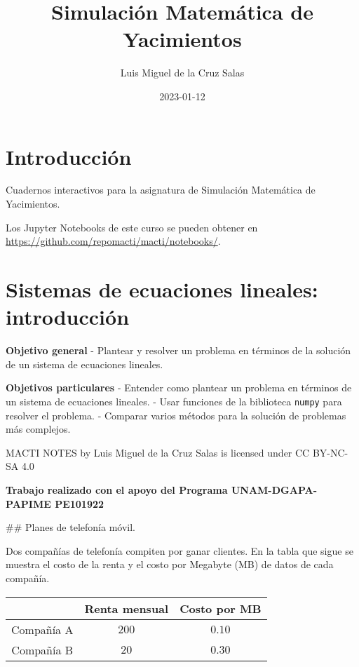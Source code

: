 \documentclass[
  letterpaper,
  DIV=11,
  numbers=noendperiod]{scrreprt}
\title{Simulación Matemática de Yacimientos}
\author{Luis Miguel de la Cruz Salas}
\date{2023-01-12}
\renewcommand*\contentsname{Table of contents}
\newcommand\contentsname{Table of contents}
\begin{document}
\maketitle

\renewcommand*\contentsname{Table of contents}
{
\hypersetup{linkcolor=}
\setcounter{tocdepth}{2}
\tableofcontents
}

\chapter*{Introducción}\label{introducciuxf3n}


Cuadernos interactivos para la asignatura de Simulación Matemática de
Yacimientos.

Los Jupyter Notebooks de este curso se pueden obtener en
\url{https://github.com/repomacti/macti/notebooks/}.


\chapter{Sistemas de ecuaciones lineales:
introducción}\label{sistemas-de-ecuaciones-lineales-introducciuxf3n}

\textbf{Objetivo general} - Plantear y resolver un problema en términos
de la solución de un sistema de ecuaciones lineales.

\textbf{Objetivos particulares} - Entender como plantear un problema en
términos de un sistema de ecuaciones lineales. - Usar funciones de la
biblioteca \texttt{numpy} para resolver el problema. - Comparar varios
métodos para la solución de problemas más complejos.

MACTI NOTES by {Luis Miguel de la Cruz Salas} is licensed under CC
BY-NC-SA 4.0

\textbf{Trabajo realizado con el apoyo del Programa UNAM-DGAPA-PAPIME
PE101922}

\#\# Planes de telefonía móvil.

Dos compañías de telefonía compiten por ganar clientes. En la tabla que
sigue se muestra el costo de la renta y el costo por Megabyte (MB) de
datos de cada compañía.

\begin{longtable}[]{@{}ccc@{}}
\toprule\noalign{}
& Renta mensual & Costo por MB \\
\midrule\noalign{}
\endhead
\bottomrule\noalign{}
\endlastfoot
Compañía A & \(200\) & \(0.10\) \\
Compañía B & \(20\) & \(0.30\) \\
\end{longtable}
\end{document}
